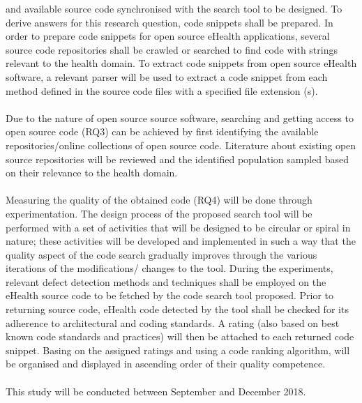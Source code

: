 \documentclass[a4paper]{article}
\begin{document}
and available source code synchronised with the search tool to be designed. To derive answers for this research question, code snippets shall be prepared. In order to prepare code snippets for open source eHealth applications, several source code repositories shall be crawled or searched to find code with strings relevant to the health domain. To extract code snippets from open source eHealth software, a relevant parser will be used to extract a code snippet from each method defined in the source code files with a specified file extension (s).\\ \\
Due to the nature of open source source software, searching and getting access to open source code (RQ3) can be achieved by first identifying the available repositories/online collections of open source code. Literature about existing open source repositories will be reviewed and the identified population sampled based on their relevance to the health domain.\\ \\
Measuring the quality of the obtained code (RQ4) will be done through experimentation. The design process of the proposed search tool will be performed with a set of activities that will be designed to be circular or spiral in nature; these activities will be developed and implemented in such a way that the quality aspect of the code search gradually improves through the various iterations of the modifications/ changes to the tool. During the experiments, relevant defect detection methods and techniques shall be employed on the eHealth source code to be fetched by the code search tool proposed. Prior to returning source code, eHealth code detected by the tool shall be checked for its adherence to architectural and coding standards. A rating (also based on best known code standards and practices) will then be attached to each returned code snippet. Basing on the assigned ratings and using a code ranking algorithm, will be organised and displayed in ascending order of their quality competence.  \\ \\This study will be conducted between September and December 2018.
\vspace{-10pt}
\end{document}
